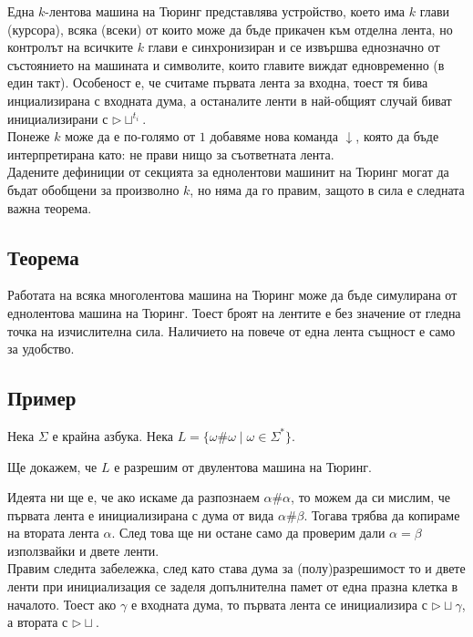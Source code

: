 \documentclass[14pt]{extarticle}
\begin{document}
Една \(k\)-лентова машина на Тюринг представлява устройство, което има \(k\) глави (курсора), всяка (всеки) от които може да бъде прикачен към отделна лента, но контролът на всичките \(k\) глави е синхронизиран и се извършва еднозначно от състоянието на машината и символите, които главите виждат едновременно (в един такт). Особеност е, че считаме първата лента за входна, тоест тя бива инциализирана с входната дума, а останалите ленти в най-общият случай биват инициализирани с \(\triangleright \sqcup^{t_i}\).\\

Понеже \(k\) може да е по-голямо от \(1\) добавяме нова команда \(\downarrow\), която да бъде интерпретирана като: не прави нищо за съответната лента. \\

Дадените дефиниции от секцията за еднолентови машинит на Тюринг могат да бъдат обобщени за произволно \(k\), но няма да го правим,
защото в сила е следната важна теорема.

\subsection*{Теорема}
Работата на всяка многолентова машина на Тюринг може да бъде симулирана от еднолентова машина на Тюринг.
Тоест броят на лентите е без значение от гледна точка на изчислителна сила. Наличието на повече от една лента същност е само за удобство.

\subsection*{Пример}
Нека \(\Sigma\) е крайна азбука.
Нека \(L = \{\omega\#\omega \mid \omega \in \Sigma^*\}\).

Ще докажем, че \(L\) е разрешим от двулентова машина на Тюринг.

Идеята ни ще е, че ако искаме да разпознаем \(\alpha\#\alpha\), то можем да си мислим, че първата лента е инициализирана с дума от вида \(\alpha\#\beta\).
Тогава трябва да копираме на втората лента \(\alpha\). След това ще ни остане само да проверим дали \(\alpha = \beta\) използвайки и двете ленти. \\

Правим следнта забележка, след като става дума за (полу)разрешимост то и двете ленти при инициализация се заделя допълнителна памет от една празна клетка в началото. Тоест ако \(\gamma\) е входната дума, то първата лента се инициализира с \(\triangleright \sqcup \gamma\), а втората с \(\triangleright \sqcup\). \\
\end{document}
